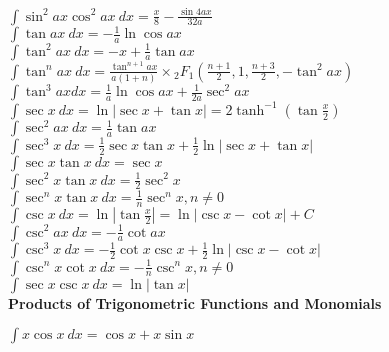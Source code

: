 \documentclass[10pt,landscape,a4paper]{article}
\begin{document}
\begin{multicols*}{3}
$
\int \sin^2 ax \cos^2 ax\ dx = \frac{x}{8}-\frac{\sin 4ax}{32a}
$\\

$
\int \tan ax\ dx = -\frac{1}{a} \ln \cos ax 
$\\

$
\int \tan^2 ax\ dx = -x + \frac{1}{a} \tan ax 
$\\

$
\int \tan^n ax\ dx = 
\frac{\tan^{n+1} ax }{a(1+n)} \times
 {_2}F_1\left( \frac{n+1}{2}, 
1, \frac{n+3}{2}, -\tan^2 ax \right) 
$\\

$
\int \tan^3 ax dx = \frac{1}{a} \ln \cos ax + \frac{1}{2a}\sec^2 ax 
$\\

$
\int \sec x \ dx = \ln | \sec x + \tan x | = 2 \tanh^{-1} \left (\tan \frac{x}{2} \right) 
$\\

$
\int \sec^2 ax\ dx = \frac{1}{a} \tan ax 
$\\

$\label{eq:Kloeppel}
\int \sec^3 x \ {dx} = \frac{1}{2} \sec x \tan x + \frac{1}{2}\ln | \sec x + \tan x |
$\\

$
\int \sec x \tan x\ dx = \sec x 
$\\

$
\int \sec^2 x \tan x\ dx = \frac{1}{2} \sec^2 x 
$\\

$
\int \sec^n x \tan x \ dx = \frac{1}{n} \sec^n x , n\ne 0
$\\

$
\int \csc x\ dx = \ln \left | \tan \frac{x}{2} \right|  = \ln | \csc x - \cot x| + C
$\\

$
\int \csc^2 ax\ dx = -\frac{1}{a} \cot ax 
$\\

$
\int \csc^3 x\ dx = -\frac{1}{2}\cot x \csc x + \frac{1}{2} \ln | \csc x - \cot x | 
$\\

$
\int \csc^nx \cot x\ dx = -\frac{1}{n}\csc^n x, n\ne 0
$\\

$
\int \sec x \csc x \ dx = \ln | \tan x | 
$\\


\textbf{Products of Trigonometric Functions and Monomials}

$
\int x \cos x \ dx = \cos x + x \sin x 
$\\


\end{multicols*}
\end{document}
